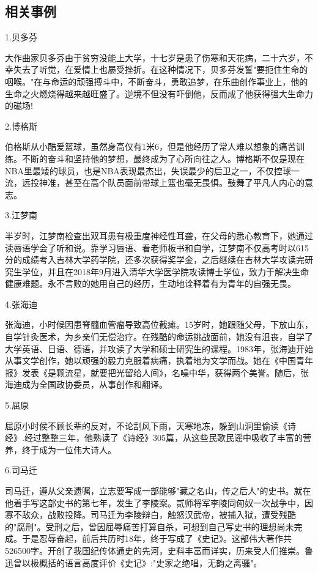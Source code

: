 \documentclass[UTF8]{ctexart}
\begin{document}
\subsection{相关事例}
1.贝多芬\par
大作曲家贝多芬由于贫穷没能上大学，十七岁是患了伤寒和天花病，二十六岁，不幸失去了听觉，在爱情上也屡受挫折。在这种情况下，贝多芬发誓"要扼住生命的咽喉。"在与命运的顽强搏斗中，不断奋斗，勇敢追梦，在乐曲创作事业上，他的生命之火燃烧得越来越旺盛了。逆境不但没有吓倒他，反而成了他获得强大生命力的磁场!\par
2.博格斯\par
伯格斯从小酷爱篮球，虽然身高仅有1米6，但是他经历了常人难以想象的痛苦训练。不断的奋斗和坚持他的梦想，最终成为了心所向往之人。博格斯不仅是现在NBA里最矮的球员，也是NBA表现最杰出，失误最少的后卫之一，不仅控球一流，远投神准，甚至在高个队员面前带球上篮也毫无畏惧。鼓舞了平凡人内心的意志。\par
3.江梦南\par
半岁时，江梦南检查出双耳患有极重度神经性耳聋，在父母的悉心教育下，她通过读唇语学会了听和说。靠学习唇语、看老师板书和自学，江梦南不仅高考时以615分的成绩考入吉林大学药学院，还多次获得奖学金，之后继续在吉林大学攻读完研究生学位，并且在2018年9月进入清华大学医学院攻读博士学位，致力于解决生命健康难题。永不言败的她用自己的经历，生动地诠释着有为青年的自强无畏。\par
4.张海迪\par
张海迪，小时候因患脊髓血管瘤导致高位截瘫。15岁时，她跟随父母，下放山东，自学针灸医术，为乡亲们无偿治疗。在残酷的命运挑战面前，她没有沮丧，自学了大学英语、日语、德语，并攻读了大学和硕士研究生的课程。1983年，张海迪开始从事文学创作，她以顽强的毅力克服着病痛，执着地为文学而战。她在《中国青年报》发表《是颗流星，就要把光留给人间》，名噪中华，获得两个美誉。随后，张海迪成为全国政协委员，从事创作和翻译。\par
5.屈原\par
屈原小时侯不顾长辈的反对，不论刮风下雨，天寒地冻，躲到山洞里偷读《诗经》.经过整整三年，他熟读了《诗经》305篇，从这些民歌民谣中吸收了丰富的营养，终于成为一位伟大诗人。\par
6.司马迁\par
司马迁，遵从父亲遗嘱，立志要写成一部能够"藏之名山，传之后人"的史书。就在他着手写这部史书的第七年，发生了李陵案。贰师将军李陵同匈奴一次战争中，因寡不敌众，战败投降。司马迁为李陵辩白，触怒汉武帝，被捕入狱，遭受残酷的"腐刑"。受刑之后，曾因屈辱痛苦打算自杀，可想到自己写史书的理想尚未完成。于是忍辱奋起，前后共历时18年，终于写成了《史记》。这部伟大著作共526500字。开创了我国纪传体通史的先河，史料丰富而详实，历来受人们推崇。鲁迅曾以极概括的语言高度评价《史记》:"史家之绝唱，无韵之离骚"。\par
\end{document}
